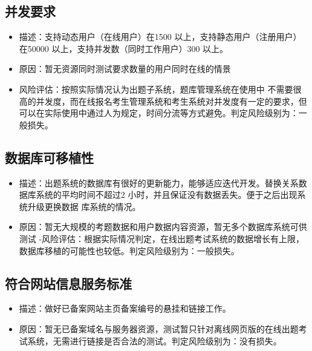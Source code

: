 \documentclass[hyperref, a4paper]{ctexart}
\providecommand{\tightlist}{%
  \setlength{\itemsep}{0pt}\setlength{\parskip}{0pt}}
\begin{document}
\hypertarget{ux5e76ux53d1ux8981ux6c42-1}{%
\subsection{并发要求}\label{ux5e76ux53d1ux8981ux6c42-1}}

\begin{itemize}
\tightlist
\item
  描述：支持动态用户（在线用户）在1500 以上，支持静态用户（注册用户）
  在50000 以上，支持并发数（同时工作用户）300 以上。
\item
  原因：暂无资源同时测试要求数量的用户同时在线的情景
\item
  风险评估：按照实际情况认为出题子系统，题库管理系统在使用中
  不需要很高的并发度，而在线报名考生管理系统和考生系统对并发度有一定的要求，但可以在实际使用中通过人为规定，时间分流等方式避免。判定风险级别为：一般损失。
\end{itemize}

\hypertarget{ux6570ux636eux5e93ux53efux79fbux690dux6027-1}{%
\subsection{数据库可移植性}\label{ux6570ux636eux5e93ux53efux79fbux690dux6027-1}}

\begin{itemize}
\tightlist
\item
  描述：出题系统的数据库有很好的更新能力，能够适应迭代开发。替换关系数据库系统的平均时间不超过2
  小时，并且保证没有数据丢失。便于之后出现系统升级更换数据
  库系统的情况。
\item
  原因：暂无大规模的考题数据和用户数据内容资源，暂无多个数据库系统可供测试
  -风险评估：根据实际情况判定，在线出题考试系统的数据增长有上限，数据库移植的可能性也较低。判定风险级别为：一般损失。
\end{itemize}

\hypertarget{ux7b26ux5408ux7f51ux7ad9ux4fe1ux606fux670dux52a1ux6807ux51c6-1}{%
\subsection{符合网站信息服务标准}\label{ux7b26ux5408ux7f51ux7ad9ux4fe1ux606fux670dux52a1ux6807ux51c6-1}}

\begin{itemize}
\tightlist
\item
  描述：做好已备案网站主页备案编号的悬挂和链接工作。
\item
  原因：暂无已备案域名与服务器资源，测试暂只针对离线网页版的在线出题考试系统，无需进行链接是否合法的测试。判定风险级别为：没有损失。
\end{itemize}
\end{document}
